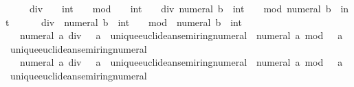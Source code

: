 \begin{isabellebody}
\ \ \ {\isachardoublequoteopen}{\isacharminus}{\kern0pt}\ {}\ div\ {\isacharminus}{\kern0pt}\ {}\ {\isacharcolon}{\kern0pt}{\isacharcolon}{\kern0pt}\ int{\isachardoublequoteclose}\ {\isacharbar}{\kern0pt}\ {\isachardoublequoteopen}{\isacharminus}{\kern0pt}\ {}\ mod\ {\isacharminus}{\kern0pt}\ {}\ {\isacharcolon}{\kern0pt}{\isacharcolon}{\kern0pt}\ int{\isachardoublequoteclose}\ {\isacharbar}{\kern0pt}\ {\isachardoublequoteopen}{\isacharminus}{\kern0pt}\ {}\ div\ numeral\ b\ {\isacharcolon}{\kern0pt}{\isacharcolon}{\kern0pt}\ int{\isachardoublequoteclose}\ {\isacharbar}{\kern0pt}\ {\isachardoublequoteopen}{\isacharminus}{\kern0pt}\ {}\ mod\ numeral\ b\ {\isacharcolon}{\kern0pt}{\isacharcolon}{\kern0pt}\ int{\isachardoublequoteclose}\ {\isacharbar}{\kern0pt}\isanewline
\ \ \ {\isachardoublequoteopen}{\isacharminus}{\kern0pt}\ {}\ div\ {\isacharminus}{\kern0pt}\ numeral\ b\ {\isacharcolon}{\kern0pt}{\isacharcolon}{\kern0pt}\ int{\isachardoublequoteclose}\ {\isacharbar}{\kern0pt}\ {\isachardoublequoteopen}{\isacharminus}{\kern0pt}\ {}\ mod\ {\isacharminus}{\kern0pt}\ numeral\ b\ {\isacharcolon}{\kern0pt}{\isacharcolon}{\kern0pt}\ int{\isachardoublequoteclose}\ {\isacharbar}{\kern0pt}\isanewline
\ \ \ {\isachardoublequoteopen}numeral\ a\ div\ {}\ {\isacharcolon}{\kern0pt}{\isacharcolon}{\kern0pt}\ {\isacharprime}{\kern0pt}a\ {\isacharcolon}{\kern0pt}{\isacharcolon}{\kern0pt}\ unique{\isacharunderscore}{\kern0pt}euclidean{\isacharunderscore}{\kern0pt}semiring{\isacharunderscore}{\kern0pt}numeral{\isachardoublequoteclose}\ {\isacharbar}{\kern0pt}\ {\isachardoublequoteopen}numeral\ a\ mod\ {}\ {\isacharcolon}{\kern0pt}{\isacharcolon}{\kern0pt}\ {\isacharprime}{\kern0pt}a\ {\isacharcolon}{\kern0pt}{\isacharcolon}{\kern0pt}\ unique{\isacharunderscore}{\kern0pt}euclidean{\isacharunderscore}{\kern0pt}semiring{\isacharunderscore}{\kern0pt}numeral{\isachardoublequoteclose}\ {\isacharbar}{\kern0pt}\isanewline
\ \ \ {\isachardoublequoteopen}numeral\ a\ div\ {}\ {\isacharcolon}{\kern0pt}{\isacharcolon}{\kern0pt}\ {\isacharprime}{\kern0pt}a\ {\isacharcolon}{\kern0pt}{\isacharcolon}{\kern0pt}\ unique{\isacharunderscore}{\kern0pt}euclidean{\isacharunderscore}{\kern0pt}semiring{\isacharunderscore}{\kern0pt}numeral{\isachardoublequoteclose}\ {\isacharbar}{\kern0pt}\ {\isachardoublequoteopen}numeral\ a\ mod\ {}\ {\isacharcolon}{\kern0pt}{\isacharcolon}{\kern0pt}\ {\isacharprime}{\kern0pt}a\ {\isacharcolon}{\kern0pt}{\isacharcolon}{\kern0pt}\ unique{\isacharunderscore}{\kern0pt}euclidean{\isacharunderscore}{\kern0pt}semiring{\isacharunderscore}{\kern0pt}numeral{\isachardoublequoteclose}\ {\isacharbar}{\kern0pt}\isanewline

\end{isabellebody}
